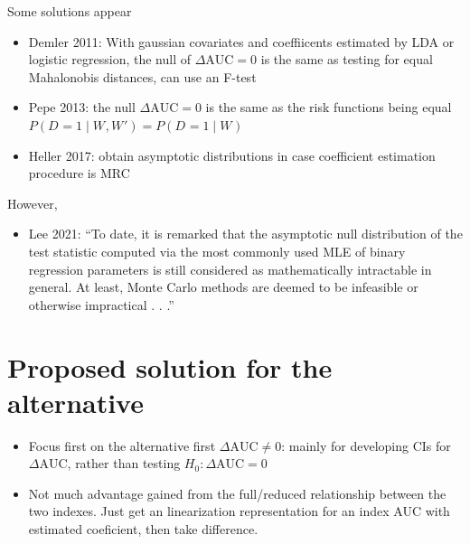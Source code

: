 \documentclass{beamer}
\newcommand{\W}[1][]{W_{#1}}
\newcommand{\D}[1][]{D_{#1}}
\newcommand{\aucdiff}{\Delta\text{AUC}}
\begin{document}
\begin{frame}
  Some solutions appear
\begin{itemize}
\item Demler 2011: With gaussian covariates and coeffiicents estimated by LDA or logistic regression, the null of $\aucdiff=0$ is the same as testing for equal Mahalonobis distances, can use an F-test

\item Pepe 2013: the null $\aucdiff=0$ is the same as the risk functions being equal $P(\D=1\mid \W,\W')=P(\D=1\mid \W)$

\item Heller 2017: obtain asymptotic distributions in case coefficient estimation procedure is MRC
\end{itemize}
However,
\begin{itemize}
\item Lee 2021: ``To date, it is remarked that
the asymptotic null distribution of the test statistic computed via the most commonly used MLE of binary
regression parameters is still considered as mathematically intractable in general. At least, Monte Carlo methods
are deemed to be infeasible or otherwise impractical . . .''
\end{itemize}
\end{frame}

\section{Proposed solution for the alternative}

\begin{frame}
  \begin{itemize}
    \item Focus first on the alternative first $\aucdiff\neq 0$: mainly for developing CIs for $\aucdiff$, rather than testing $H_0:\aucdiff=0$


\item Not much advantage gained from the full/reduced relationship
  between the two indexes. Just get an linearization representation for an index
AUC with estimated coeficient, then take difference.
\end{itemize}
\end{frame}
\end{document}
